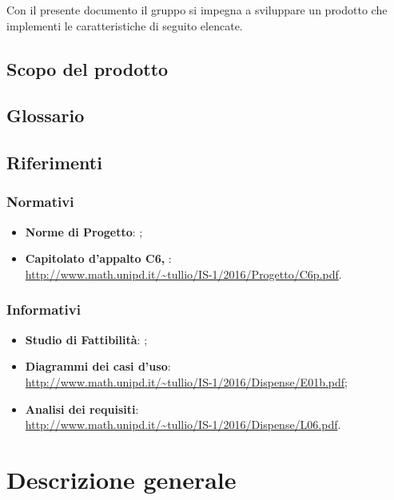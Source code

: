 Con il presente documento il gruppo \hx{} si impegna a sviluppare un prodotto che implementi le caratteristiche di seguito elencate.

\subsection{Scopo del prodotto}
\scopo

\subsection{Glossario}
\presgloss

\subsection{Riferimenti}
\subsubsection{Normativi}
\begin{itemize}
	\item \textbf{Norme di Progetto}: \NdP;
	\item \textbf{Capitolato d'appalto C6, \proj}: \\
	\url{http://www.math.unipd.it/~tullio/IS-1/2016/Progetto/C6p.pdf}.
\end{itemize}

\subsubsection{Informativi}
\begin{itemize}
	\item \textbf{Studio di Fattibilità}: \SdF;
	\item \textbf{Diagrammi dei casi d'uso}: \\
	\url{http://www.math.unipd.it/~tullio/IS-1/2016/Dispense/E01b.pdf};
	\item \textbf{Analisi dei requisiti}: \\
	\url{http://www.math.unipd.it/~tullio/IS-1/2016/Dispense/L06.pdf}.
\end{itemize}






\section{Descrizione generale}

